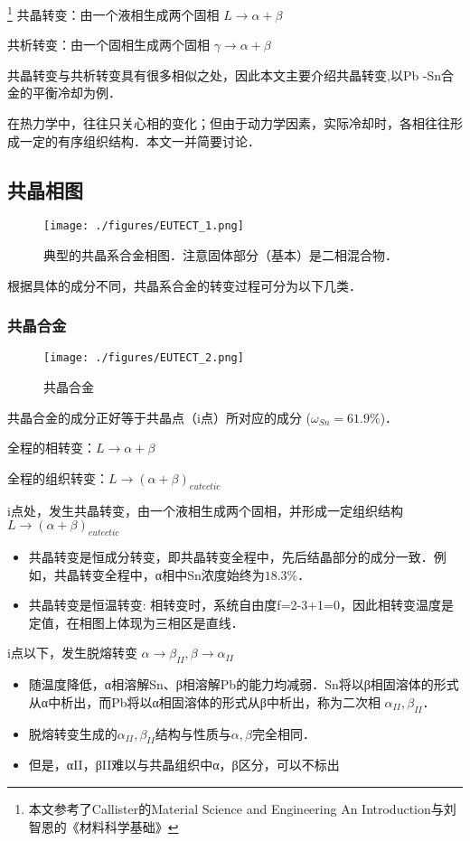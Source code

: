 
\footnote{本文参考了Callister的Material Science and Engineering An Introduction与刘智恩的《材料科学基础》}
共晶转变：由一个液相生成两个固相 $L \rightarrow \alpha+\beta$

共析转变：由一个固相生成两个固相 $\gamma \rightarrow \alpha+\beta$

共晶转变与共析转变具有很多相似之处，因此本文主要介绍共晶转变,以Pb
-Sn合金的平衡冷却为例．

在热力学中，往往只关心相的变化；但由于动力学因素，实际冷却时，各相往往形成一定的有序组织结构．本文一并简要讨论．

\subsection{共晶相图}
\begin{figure}[ht]
\centering
\texttt{[image: ./figures/EUTECT\_1.png]}
\caption{典型的共晶系合金相图．注意固体部分（基本）是二相混合物．} \label{EUTECT_fig1}
\end{figure}
根据具体的成分不同，共晶系合金的转变过程可分为以下几类．

\subsubsection{共晶合金}
\begin{figure}[ht]
\centering
\texttt{[image: ./figures/EUTECT\_2.png]}
\caption{共晶合金} \label{EUTECT_fig2}
\end{figure}

共晶合金的成分正好等于共晶点（i点）所对应的成分 ($\omega_{Sn}=61.9\%$)．

全程的相转变：$L \rightarrow \alpha+\beta$

全程的组织转变：$L \rightarrow (\alpha+\beta)_{eutectic}$

i点处，发生共晶转变，由一个液相生成两个固相，并形成一定组织结构 $L \rightarrow (\alpha+\beta)_{eutectic}$
\begin{itemize}
\item 共晶转变是恒成分转变，即共晶转变全程中，先后结晶部分的成分一致．例如，共晶转变全程中，α相中Sn浓度始终为$18.3\%$．
\item 共晶转变是恒温转变: 相转变时，系统自由度f=2-3+1=0，因此相转变温度是定值，在相图上体现为三相区是直线．
\end{itemize}

i点以下，发生脱熔转变 $\alpha \rightarrow \beta_{II}, \beta \rightarrow \alpha_{II}$
\begin{itemize}
\item 随温度降低，α相溶解Sn、β相溶解Pb的能力均减弱．Sn将以β相固溶体的形式从α中析出，而Pb将以α相固溶体的形式从β中析出，称为二次相 $\alpha_{II},\beta_{II} $．
\item 脱熔转变生成的$\alpha_{II},\beta_{II} $结构与性质与$\alpha, \beta$完全相同．
\item 但是，αII，βII难以与共晶组织中α，β区分，可以不标出
\end{itemize}

